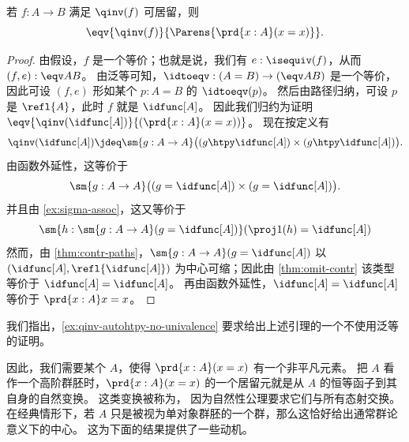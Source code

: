 \begin{lem}\label{lem:qinv-autohtpy}
  若 $f:A\to B$ 满足 $\qinv (f)$ 可居留，则
  \[\eqv{\qinv(f)}{\Parens{\prd{x:A}(x=x)}}.\]
\end{lem}
\begin{proof}
  由假设，$f$ 是一个等价；也就是说，我们有 $e:\isequiv(f)$，从而 $(f,e):\eqv A B$。
  由泛等可知，$\idtoeqv:(A=B) \to (\eqv A B)$ 是一个等价，因此可设 $(f,e)$ 形如某个 $p:A=B$ 的 $\idtoeqv(p)$。
  然后由路径归纳，可设 $p$ 是 $\refl{A}$，此时 $f$ 就是 $\idfunc[A]$。
  因此我们归约为证明 $\eqv{\qinv(\idfunc[A])}{(\prd{x:A}(x=x))}$。
  现在按定义有
  \[ \qinv(\idfunc[A]) \jdeq
  \sm{g:A\to A} \big((g \htpy \idfunc[A]) \times (g \htpy \idfunc[A])\big).
  \]
  由函数外延性，这等价于
  \[ \sm{g:A\to A} \big((g = \idfunc[A]) \times (g = \idfunc[A])\big).
  \]
  并且由 \cref{ex:sigma-assoc}，这又等价于
  \[ \sm{h:\sm{g:A\to A} (g = \idfunc[A])} (\proj1(h) = \idfunc[A])
  \]
  然而，由 \cref{thm:contr-paths}，$\sm{g:A\to A} (g = \idfunc[A])$ 以 $(\idfunc[A],\refl{\idfunc[A]})$ 为中心可缩；因此由 \cref{thm:omit-contr} 该类型等价于 $\idfunc[A] = \idfunc[A]$。
  再由函数外延性，$\idfunc[A] = \idfunc[A]$ 等价于 $\prd{x:A} x=x$。
\end{proof}

\noindent
我们指出，\cref{ex:qinv-autohtpy-no-univalence} 要求给出上述引理的一个不使用泛等的证明。

因此，我们需要某个 $A$，使得 $\prd{x:A}(x=x)$ 有一个非平凡元素。
把 $A$ 看作一个高阶群胚时，$\prd{x:A}(x=x)$ 的一个居留元就是从 $A$ 的恒等函子到其自身的自然变换。
这类变换被称为，
%
%
因为自然性公理要求它们与所有态射交换。
在经典情形下，若 $A$ 只是被视为单对象群胚的一个群，那么这恰好给出通常群论意义下的中心。
这为下面的结果提供了一些动机。

